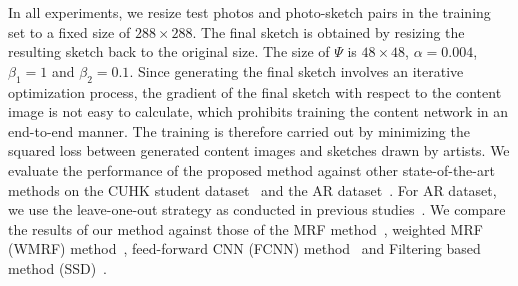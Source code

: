 \documentclass[10pt,twocolumn,letterpaper]{article}
\begin{document}
In all experiments, we resize test photos and photo-sketch pairs in the training set to a fixed size of $288\times288$. The final sketch is obtained by resizing the resulting sketch back to the original size. The size of $\Psi$ is $48\times48$, $\alpha=0.004$, $\beta_1=1$ and $\beta_2=0.1$. Since generating the final sketch involves an iterative optimization process, the gradient of the final sketch with respect to the content image is not easy to calculate, which prohibits training the content network in an end-to-end manner.  The training is therefore carried out by minimizing the squared loss between generated content images and sketches drawn by artists. We evaluate the performance of the proposed method against other state-of-the-art methods on the CUHK student dataset~\cite{wang2009face} and the AR dataset~\cite{martinez1998r}. For AR dataset, we use the leave-one-out strategy as conducted in previous studies~\cite{song2014real,wang2009face}. We compare the results of our method against those of the MRF method~\cite{wang2009face}, weighted MRF (WMRF) method~\cite{zhou2012markov}, feed-forward CNN (FCNN) method~\cite{zhang2015end} and Filtering based method (SSD)~\cite{song2014real}.
\end{document}
